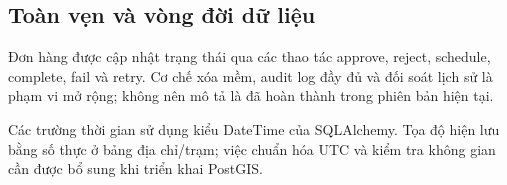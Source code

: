 \subsection{Toàn vẹn và vòng đời dữ liệu}

Đơn hàng được cập nhật trạng thái qua các thao tác approve, reject, schedule, complete, fail và retry. Cơ chế xóa mềm, audit log đầy đủ và đối soát lịch sử là phạm vi mở rộng; không nên mô tả là đã hoàn thành trong phiên bản hiện tại.

Các trường thời gian sử dụng kiểu DateTime của SQLAlchemy. Tọa độ hiện lưu bằng số thực ở bảng địa chỉ/trạm; việc chuẩn hóa UTC và kiểm tra không gian cần được bổ sung khi triển khai PostGIS.


